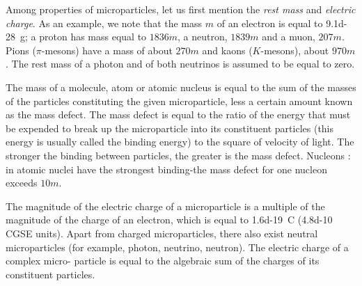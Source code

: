 \documentclass[a4paper,sfsidenotes,colorlinks=true]{tufte-book}
\numberwithin{equation}{section}
\numberwithin{figure}{section}
\begin{document}
Among properties of microparticles, let us first mention the \emph{rest mass}
and \emph{electric charge}. As an example, we note that the mass $m$ of an
electron is equal to \SI{9.1d-28}{\gram}; a proton has mass equal to $1836m$, a neutron, $1839m$ and a muon, $207m$. Pions ($\pi$-mesons) have a mass of about $270m$ and kaons ($K$-mesons), about $970m$. The rest mass of a photon and of both neutrinos is assumed to be equal to zero.

The mass of a molecule, atom or atomic nucleus is equal to the sum of the masses of the particles constituting the given microparticle, less a certain amount known as the mass defect. The mass defect is equal to the ratio of the energy that must be expended to break up the microparticle into its constituent particles (this energy is usually called the binding energy) to the square of velocity of light. The stronger the binding between particles, the greater is the mass defect. Nucleons : in atomic nuclei have the strongest binding-the mass defect for one nucleon exceeds $10m$.

The magnitude of the electric charge of a microparticle is a multiple of the magnitude of the charge of an electron, which is equal to \SI{1.6d-19}{\coulomb} (\num{4.8d-10} CGSE units). Apart from charged microparticles, there also exist neutral microparticles (for example, photon, neutrino, neutron). The electric charge of a complex micro- particle is equal to the algebraic sum of the charges of its constituent particles.
\end{document}
